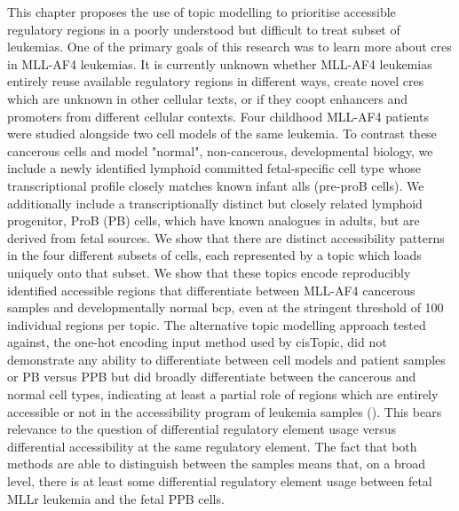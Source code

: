 This chapter proposes the use of topic modelling to prioritise accessible regulatory regions in a poorly understood but difficult to treat subset of leukemias. One of the primary goals of this research was to learn more about \glspl{cre} in MLL-AF4 leukemias. It is currently unknown whether MLL-AF4 leukemias entirely reuse available regulatory regions in different ways, create novel \glspl{cre} which are unknown in other cellular texts, or if they coopt enhancers and promoters from different cellular contexts. Four childhood MLL-AF4 patients were studied alongside two cell models of the same leukemia. To contrast these cancerous cells and model "normal", non-cancerous, developmental biology, we include a newly identified lymphoid committed fetal-specific cell type whose transcriptional profile closely matches known infant \glspl{all} (pre-proB cells). We additionally include a transcriptionally distinct but closely related lymphoid progenitor, ProB (PB) cells, which have known analogues in adults, but are derived from fetal sources.  We show that there are distinct accessibility patterns in the four different subsets of cells, each represented by a topic which loads uniquely onto that subset. We show that these topics encode reproducibly identified accessible regions that differentiate between MLL-AF4 cancerous samples and developmentally normal \gls{bcp}, even at the stringent threshold of 100 individual regions per topic. The alternative topic modelling approach tested against, the one-hot encoding input method used by cisTopic, did not demonstrate any ability to differentiate between cell models and patient samples or PB versus PPB but did broadly differentiate between the cancerous and normal cell types, indicating at least a partial role of regions which are entirely accessible or not in the accessibility program of leukemia samples (). This bears relevance to the question of differential regulatory element usage versus differential accessibility at the same regulatory element. The fact that both methods are able to distinguish between the samples means that, on a broad level, there is at least some differential regulatory element usage between fetal MLLr leukemia and the fetal PPB cells. 

